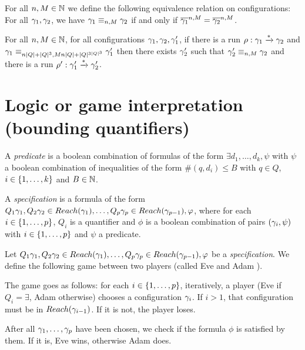 \documentclass[a4paper,UKenglish,cleveref, autoref, thm-restate]{lipics-v2021}
\newcommand{\corto}[1]{\todo[color=blue!20]{\small #1}}
\begin{document}
	
	For all $n, M \in \nats$ we define the following equivalence relation on configurations: 
	For all $\config_1, \config_2$, we have $\config_1 \equiv_{n,M} \config_2$ if and only if $\configapprox{n}{M}{\config_1} = \configapprox{n}{M}{\config_2}$.
	
	

	\begin{lemma}
		For all $n, M \in \nats$, for all configurations $\config_1, \config_2, \config_1'$, if there is a run $\run : \config_1 \xrightarrow{*} \config_2$ and $\config_1 \equiv_{n\size{Q}+\size{Q}^3,Mn\size{Q}+\size{Q}^{3\size{Q}^3}} \config'_1$ then there exists $\config'_2$ such that $\config'_2 \equiv_{n,M} \config_2$ and there is a run $\run' : \config_1' \xrightarrow{*} \config_2'$.
	\end{lemma}
	
	\section{Logic or game interpretation (bounding quantifiers)}
	
	\begin{definition}
		A \emph{predicate} is a boolean combination of formulas of the form $\exists d_1, \ldots, d_k, \psi$ with $\psi$ a boolean combination of inequalities of the form $\#(q,d_i) \leq B$ with $q\in Q$, $i \in \nset{1}{k}$ and $B \in \nats$.
		
		A \emph{specification} is a formula of the form $Q_1 \config_1, Q_2 \config_2  \in \Reach(\config_1), \ldots, Q_p \config_p \in \Reach(\config_{p-1}), \phi$, where for each $i \in \nset{1}{p}$, $Q_i$ is a quantifier and $\phi$ is a boolean combination of pairs $(\config_i, \psi)$ with $i \in \nset{1}{p}$ and $\psi$ a predicate.
	\end{definition}

	\begin{definition}
		Let $Q_1 \config_1, Q_2 \config_2  \in \Reach(\config_1), \ldots, Q_p \config_p \in \Reach(\config_{p-1}), \phi$ be a \emph{specification}. We define the following game between two players (called Eve and Adam \corto{Spoiler/Duplicator?}).
		
		The game goes as follows: for each $i \in \nset{1}{p}$, iteratively, a player (Eve if $Q_i = \exists$, Adam otherwise) chooses a configuration $\config_i$. 
		If $i>1$, that configuration must be in $\Reach(\config_{i-1})$. If it is not, the player loses.
		
		After all $\config_1, \ldots, \config_p$ have been chosen, we check if the formula $\phi$ is satisfied by them. If it is, Eve wins, otherwise Adam does.
	\end{definition}
	
\end{document}
